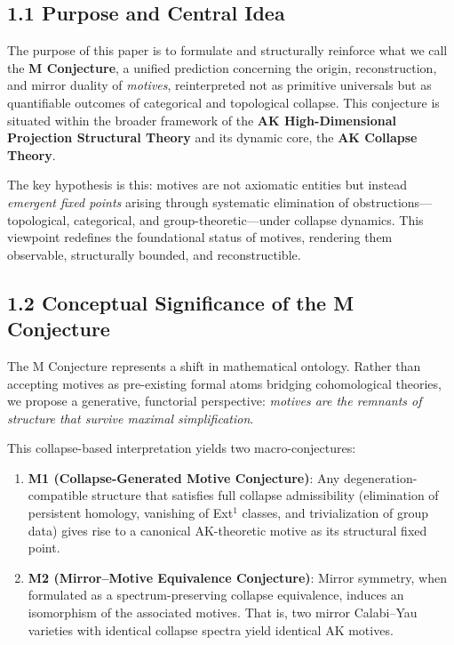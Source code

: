 \documentclass[11pt]{article}
\begin{document}
\subsection{1.1 Purpose and Central Idea}

The purpose of this paper is to formulate and structurally reinforce what we call the \textbf{M Conjecture}, a unified prediction concerning the origin, reconstruction, and mirror duality of \emph{motives}, reinterpreted not as primitive universals but as quantifiable outcomes of categorical and topological collapse. This conjecture is situated within the broader framework of the \textbf{AK High-Dimensional Projection Structural Theory} and its dynamic core, the \textbf{AK Collapse Theory}.

The key hypothesis is this: motives are not axiomatic entities but instead \emph{emergent fixed points} arising through systematic elimination of obstructions---topological, categorical, and group-theoretic---under collapse dynamics. This viewpoint redefines the foundational status of motives, rendering them observable, structurally bounded, and reconstructible.

\subsection{1.2 Conceptual Significance of the M Conjecture}

The M Conjecture represents a shift in mathematical ontology. Rather than accepting motives as pre-existing formal atoms bridging cohomological theories, we propose a generative, functorial perspective: \emph{motives are the remnants of structure that survive maximal simplification}.

This collapse-based interpretation yields two macro-conjectures:

\begin{enumerate}
    \item \textbf{M1 (Collapse-Generated Motive Conjecture)}: Any degeneration-compatible structure that satisfies full collapse admissibility (elimination of persistent homology, vanishing of Ext$^1$ classes, and trivialization of group data) gives rise to a canonical AK-theoretic motive as its structural fixed point.
    
    \item \textbf{M2 (Mirror–Motive Equivalence Conjecture)}: Mirror symmetry, when formulated as a spectrum-preserving collapse equivalence, induces an isomorphism of the associated motives. That is, two mirror Calabi--Yau varieties with identical collapse spectra yield identical AK motives.
\end{enumerate}
\end{document}
